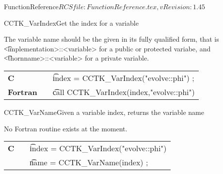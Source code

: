 \begin{cactuspart}{5}{FunctionReference}{$RCSfile: FunctionReference.tex,v $}{$Revision: 1.45 $}
\begin{CCTKFunc}{CCTK\_VarIndex}{Get the index for a variable}
\label{CCTK-VarIndex}
\showargs
\begin{params}
\end{params}
\begin{discussion}
The variable name should be the given in its fully qualified form, that is {\t <implementation>::<variable>} for a public or protected variabe, and {\t <thornname>::<variable>} for a private variable.
\end{discussion}
\begin{examples}
\begin{tabular}{@{}p{3cm}cp{11cm}}
\hfill {\bf C} && {\t index = CCTK\_VarIndex("evolve::phi") };
\\
\hfill {\bf Fortran} && {\t call CCTK\_VarIndex(index,"evolve::phi")}
\\
\end{tabular}
\end{examples}
\begin{errorcodes}
\end{errorcodes}
\end{CCTKFunc}




\begin{CCTKFunc}{CCTK\_VarName}{Given a variable index, returns the variable name}
\label{CCTK-VarName}
\showcargs
\begin{params}
\end{params}
\begin{discussion}
No Fortran routine exists at the moment.
\end{discussion}
\begin{examples}
\begin{tabular}{@{}p{3cm}cp{11cm}}
\hfill {\bf C} && {\t index = CCTK\_VarIndex("evolve::phi")}\\
               &&{\t name = CCTK\_VarName(index) ;}
\\
\end{tabular}
\end{examples}
\begin{errorcodes}
\end{errorcodes}
\end{CCTKFunc}





\end{cactuspart}
